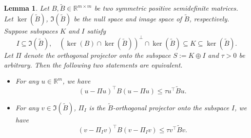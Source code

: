 \documentclass[10pt,a4paper]{amsart}
\newtheorem{lemma}{Lemma}
\begin{document}
\begin{lemma}\label{conddep}
    Let \( B, \tilde{B} \in \mathbb{R}^{m \times m} \) be two symmetric positive semidefinite matrices.
    Let \( \ker(\tilde{B}) \), \( \Im(\tilde{B}) \) be the null space and image space of \( \tilde{B} \), respectively.
    Suppose subspaces $K$ and $I$ satisfy
\[
I \subseteq \Im(\tilde B), \quad (\ker(B)\cap \ker(\tilde B))^{\perp} \cap \ker(\tilde B) \subseteq K \subseteq \ker(\tilde B).
\]
Let $\Pi$ denote the orthogonal projector onto the subspace $S := K \oplus I$ and $\tau>0$ be arbitrary. Then the following two statements are equivalent.
\begin{itemize}
    \item For any $u \in \mathbb{R}^{m}$, we have
    \[
    (u - \Pi u)^\top B (u - \Pi u) \leq \tau u^\top \tilde B u.
    \]
    \item For any $v \in \Im(\tilde B)$, $\Pi_I$ is the $\tilde{B}$-orthogonal projector onto the subspace $I$, we have
    \[
    (v - \Pi_I v)^\top B (v - \Pi_I v) \leq \tau v^\top \tilde B v.
    \]
\end{itemize}
\end{lemma}
\end{document}
